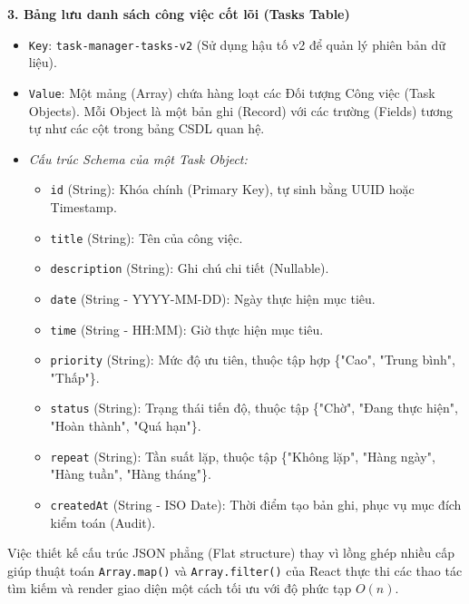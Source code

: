 \textbf{3. Bảng lưu danh sách công việc cốt lõi (Tasks Table)}
\begin{itemize}
    \item \texttt{Key}: \texttt{task-manager-tasks-v2} (Sử dụng hậu tố v2 để quản lý phiên bản dữ liệu).
    \item \texttt{Value}: Một mảng (Array) chứa hàng loạt các Đối tượng Công việc (Task Objects). Mỗi Object là một bản ghi (Record) với các trường (Fields) tương tự như các cột trong bảng CSDL quan hệ.
    \item \textit{Cấu trúc Schema của một Task Object:}
    \begin{itemize}
        \item \texttt{id} (String): Khóa chính (Primary Key), tự sinh bằng UUID hoặc Timestamp.
        \item \texttt{title} (String): Tên của công việc.
        \item \texttt{description} (String): Ghi chú chi tiết (Nullable).
        \item \texttt{date} (String - YYYY-MM-DD): Ngày thực hiện mục tiêu.
        \item \texttt{time} (String - HH:MM): Giờ thực hiện mục tiêu.
        \item \texttt{priority} (String): Mức độ ưu tiên, thuộc tập hợp \{"Cao", "Trung bình", "Thấp"\}.
        \item \texttt{status} (String): Trạng thái tiến độ, thuộc tập \{"Chờ", "Đang thực hiện", "Hoàn thành", "Quá hạn"\}.
        \item \texttt{repeat} (String): Tần suất lặp, thuộc tập \{"Không lặp", "Hàng ngày", "Hàng tuần", "Hàng tháng"\}.
        \item \texttt{createdAt} (String - ISO Date): Thời điểm tạo bản ghi, phục vụ mục đích kiểm toán (Audit).
    \end{itemize}
\end{itemize}

Việc thiết kế cấu trúc JSON phẳng (Flat structure) thay vì lồng ghép nhiều cấp giúp thuật toán \texttt{Array.map()} và \texttt{Array.filter()} của React thực thi các thao tác tìm kiếm và render giao diện một cách tối ưu với độ phức tạp $O(n)$.
